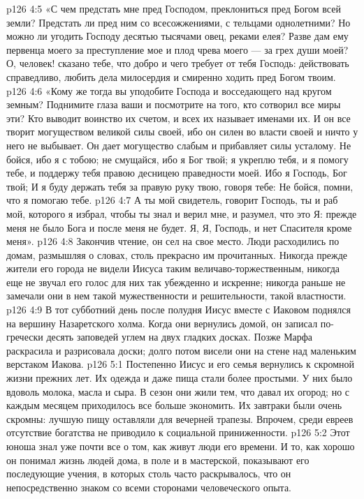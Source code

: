 \vs p126 4:5 «С чем предстать мне пред Господом, преклониться пред Богом всей земли? Предстать ли пред ним со всесожжениями, с тельцами однолетними? Но можно ли угодить Господу десятью тысячами овец, реками елея? Разве дам ему первенца моего за преступление мое и плод чрева моего --- за грех души моей? О, человек! сказано тебе, что добро и чего требует от тебя Господь: действовать справедливо, любить дела милосердия и смиренно ходить пред Богом твоим.
\vs p126 4:6 «Кому же тогда вы уподобите Господа и восседающего над кругом земным? Поднимите глаза ваши и посмотрите на того, кто сотворил все миры эти? Кто выводит воинство их счетом, и всех их называет именами их. И он все творит могуществом великой силы своей, ибо он силен во власти своей и ничто у него не выбывает. Он дает могущество слабым и прибавляет силы усталому. Не бойся, ибо я с тобою; не смущайся, ибо я Бог твой; я укреплю тебя, и я помогу тебе, и поддержу тебя правою десницею праведности моей. Ибо я Господь, Бог твой; И я буду держать тебя за правую руку твою, говоря тебе: Не бойся, помни, что я помогаю тебе.
\vs p126 4:7 А ты мой свидетель, говорит Господь, ты и раб мой, которого я избрал, чтобы ты знал и верил мне, и разумел, что это Я: прежде меня не было Бога и после меня не будет. Я, Я, Господь, и нет Спасителя кроме меня».
\vs p126 4:8 \pc Закончив чтение, он сел на свое место. Люди расходились по домам, размышляя о словах, столь прекрасно им прочитанных. Никогда прежде жители его города не видели Иисуса таким величаво\hyp{}торжественным, никогда еще не звучал его голос для них так убежденно и искренне; никогда раньше не замечали они в нем такой мужественности и решительности, такой властности.
\vs p126 4:9 В тот субботний день после полудня Иисус вместе с Иаковом поднялся на вершину Назаретского холма. Когда они вернулись домой, он записал по\hyp{}гречески десять заповедей углем на двух гладких досках. Позже Марфа раскрасила и разрисовала доски; долго потом висели они на стене над маленьким верстаком Иакова.
\vs p126 5:1 Постепенно Иисус и его семья вернулись к скромной жизни прежних лет. Их одежда и даже пища стали более простыми. У них было вдоволь молока, масла и сыра. В сезон они жили тем, что давал их огород; но с каждым месяцем приходилось все больше экономить. Их завтраки были очень скромны: лучшую пищу оставляли для вечерней трапезы. Впрочем, среди евреев отсутствие богатства не приводило к социальной приниженности.
\vs p126 5:2 Этот юноша знал уже почти все о том, как живут люди его времени. И то, как хорошо он понимал жизнь людей дома, в поле и в мастерской, показывают его последующие учения, в которых столь часто раскрывалось, что он непосредственно знаком со всеми сторонами человеческого опыта.
